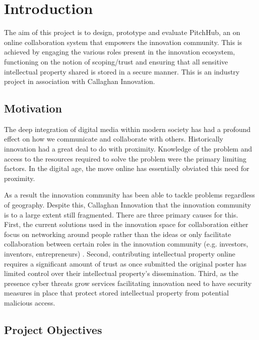 \chapter{Introduction}
The aim of this project is to design, prototype and evaluate PitchHub, an on online collaboration system that empowers the innovation community. This is achieved by engaging the various roles present in the innovation ecosystem, functioning on the notion of scoping/trust and ensuring that all sensitive intellectual property shared is stored in a secure manner. This is an industry project in association with Callaghan Innovation.


\section{Motivation}
The deep integration of digital media within modern society has had a profound effect on how we communicate and collaborate with others. Historically innovation had a great deal to do with proximity. Knowledge of the problem and access to the resources required to solve the problem were the primary limiting factors. In the digital age, the move online has essentially obviated this need for proximity. 

As a result the innovation community has been able to tackle problems regardless of geography. Despite this, Callaghan Innovation that the innovation community is to a large extent still fragmented. There are three primary causes for this.
First, the current solutions used in the innovation space for collaboration either focus on networking around people rather than the ideas \cite{Linkedin:online}\cite{Googlegroups:online} or only facilitate collaboration between certain roles in the innovation community (e.g. investors, inventors, entrepreneurs) \cite{100open:online}\cite{Pledge:online}\cite{Angel:online}\cite{Quirky:online}. Second, contributing intellectual property online requires a significant amount of trust as once submitted the original poster has limited control over their intellectual property's dissemination. Third, as the presence cyber threats grow \cite{Cybersecurity:online} services facilitating innovation need to have security measures in place that protect stored intellectual property from potential malicious access.

\section{Project Objectives}\label{S:projectObjectives}

